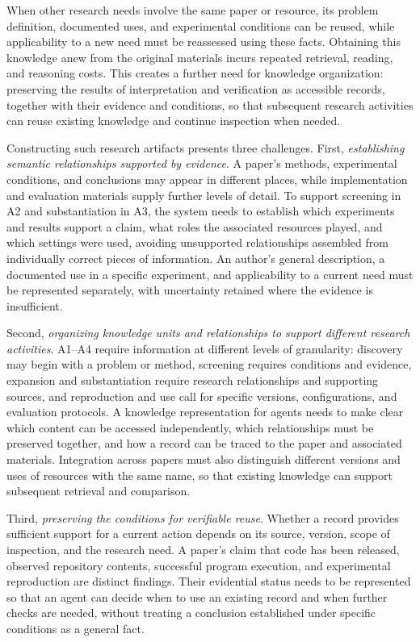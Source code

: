\documentclass[sigconf,review,anonymous]{acmart}
\begin{document}
When other research needs involve the same paper or resource, its problem
definition, documented uses, and experimental conditions can be reused, while
applicability to a new need must be reassessed using these facts. Obtaining this
knowledge anew from the original materials incurs repeated retrieval, reading,
and reasoning costs. This creates a further need for knowledge organization:
preserving the results of interpretation and verification as accessible records,
together with their evidence and conditions, so that subsequent research
activities can reuse existing knowledge and continue inspection when needed.

Constructing such research artifacts presents three challenges. First,
\emph{establishing semantic relationships supported by evidence}. A paper's
methods, experimental conditions, and conclusions may appear in different
places, while implementation and evaluation materials supply further levels of
detail. To support screening in A2 and substantiation in A3, the system needs
to establish which experiments and results support a claim, what roles the
associated resources played, and which settings were used, avoiding
unsupported relationships assembled from individually correct pieces of
information. An author's general description, a documented use in a specific
experiment, and applicability to a current need must be represented separately,
with uncertainty retained where the evidence is insufficient.

Second, \emph{organizing knowledge units and relationships to support different
research activities}. A1--A4 require information at different levels of
granularity: discovery may begin with a problem or method, screening requires
conditions and evidence, expansion and substantiation require research
relationships and supporting sources, and reproduction and use call for
specific versions, configurations, and evaluation protocols.
A knowledge representation for agents needs to make clear
which content can be accessed independently, which relationships must be
preserved together, and how a record can be traced to the paper and associated
materials. Integration across papers must also distinguish different versions
and uses of resources with the same name, so that existing knowledge can
support subsequent retrieval and comparison.

Third, \emph{preserving the conditions for verifiable reuse}. Whether a record
provides sufficient support for a current action depends on its source,
version, scope of inspection, and the research need. A paper's claim that code
has been released, observed repository contents, successful program execution,
and experimental reproduction are distinct findings. Their evidential status
needs to be represented so that an agent can decide when to use an existing
record and when further checks are needed, without treating a conclusion
established under specific conditions as a general fact.
\end{document}
